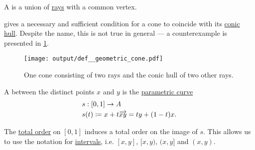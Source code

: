 \begin{definition}\label{def:geometric_cone}
  A  is a union of \hyperref[def:geometric_ray]{rays} with a common vertex.

   gives a necessary and sufficient condition for a cone to coincide with its \hyperref[def:conic_hull]{conic hull}. Despite the name, this is not true in general --- a counterexample is presented in \cref{fig:def:geometric_cone}.

  \begin{figure}[!ht]
    \centering
    \texttt{[image: output/def\_\_geometric\_cone.pdf]}
    \caption{One cone consisting of two rays and the conic hull of two other rays.}\label{fig:def:geometric_cone}
  \end{figure}
\end{definition}

\begin{definition}\label{def:line_segment}
  A  between the distinct points \( x \) and \( y \) is the \hyperref[def:parametric_curve]{parametric curve}
  \begin{equation*}
    \begin{aligned}
      &s: [0, 1] \to A \\
      &s(t) \coloneqq x + t \overrightarrow{xy} = t y + (1 - t) x.
    \end{aligned}
  \end{equation*}

  The \hyperref[def:totally_ordered_set]{total order} on \( [0, 1] \) induces a total order on the image of \( s \). This allows us to use the notation for \hyperref[def:order_interval]{intervals}, i.e. \( [x, y] \), \( [x, y) \), \( (x, y] \) and \( (x, y) \).
\end{definition}

